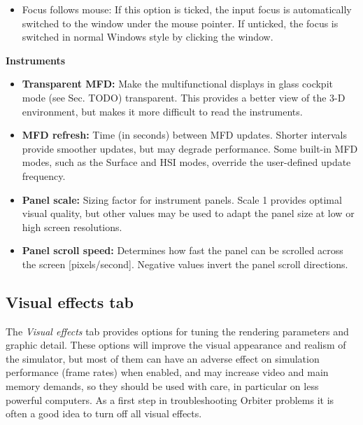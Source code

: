 \documentclass[Orbiter User Manual.tex]{subfiles}
\begin{document}
\begin{itemize}
\item Focus follows mouse: If this option is ticked, the input focus is automatically switched to the window under the mouse pointer. If unticked, the focus is switched in normal Windows style by clicking the window.
\end{itemize}

\noindent
\textbf{Instruments}

\begin{itemize}
\item \textbf{Transparent MFD:} Make the multifunctional displays in glass cockpit mode (see Sec. TODO) transparent. This provides a better view of the 3-D environment, but makes it more difficult to read the instruments.
\item \textbf{MFD refresh:} Time (in seconds) between MFD updates. Shorter intervals provide smoother updates, but may degrade performance. Some built-in MFD modes, such as the Surface and HSI modes, override the user-defined update frequency.
\item \textbf{Panel scale:} Sizing factor for instrument panels. Scale 1 provides optimal visual quality, but other values may be used to adapt the panel size at low or high screen resolutions.
\item \textbf{Panel scroll speed:} Determines how fast the panel can be scrolled across the screen [pixels/second]. Negative values invert the panel scroll directions.
\end{itemize}


\subsection{Visual effects tab}
The \textit{Visual effects} tab provides options for tuning the rendering parameters and graphic detail. These options will improve the visual appearance and realism of the simulator, but most of them can have an adverse effect on simulation performance (frame rates) when enabled, and may increase video and main memory demands, so they should be used with care, in particular on less powerful computers. As a first step in troubleshooting Orbiter problems it is often a good idea to turn off all visual effects.

\begin{figure}[H]
	\centering
\end{figure}
\end{document}
